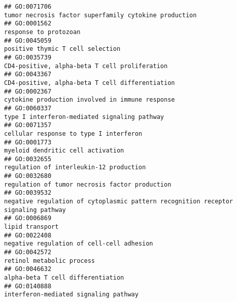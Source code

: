 \documentclass[
]{article}
\begin{document}
\begin{verbatim}
## GO:0071706                                                                                            tumor necrosis factor superfamily cytokine production
## GO:0001562                                                                                                                            response to protozoan
## GO:0045059                                                                                                                 positive thymic T cell selection
## GO:0035739                                                                                                    CD4-positive, alpha-beta T cell proliferation
## GO:0043367                                                                                                  CD4-positive, alpha-beta T cell differentiation
## GO:0002367                                                                                                  cytokine production involved in immune response
## GO:0060337                                                                                                     type I interferon-mediated signaling pathway
## GO:0071357                                                                                                           cellular response to type I interferon
## GO:0001773                                                                                                                myeloid dendritic cell activation
## GO:0032655                                                                                                          regulation of interleukin-12 production
## GO:0032680                                                                                                   regulation of tumor necrosis factor production
## GO:0039532                                                                negative regulation of cytoplasmic pattern recognition receptor signaling pathway
## GO:0006869                                                                                                                                  lipid transport
## GO:0022408                                                                                                        negative regulation of cell-cell adhesion
## GO:0042572                                                                                                                        retinol metabolic process
## GO:0046632                                                                                                                alpha-beta T cell differentiation
## GO:0140888                                                                                                            interferon-mediated signaling pathway

\end{verbatim}
\end{document}
